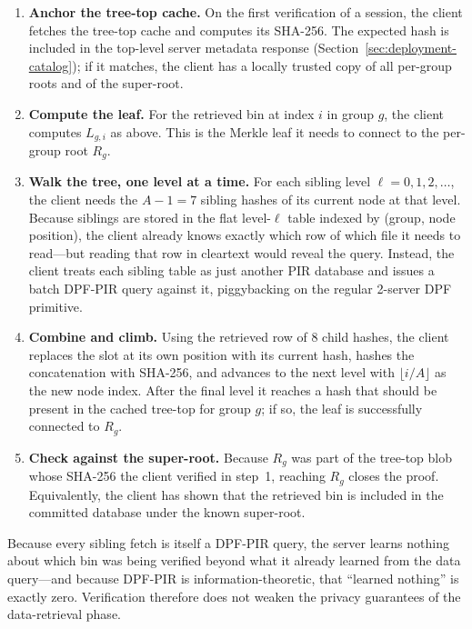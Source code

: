 \begin{enumerate}[nolistsep,leftmargin=*]
    \item \textbf{Anchor the tree-top cache.} On the first verification of a session, the client fetches the tree-top cache and computes its SHA-256. The expected hash is included in the top-level server metadata response (Section~\ref{sec:deployment-catalog}); if it matches, the client has a locally trusted copy of all per-group roots and of the super-root.

    \item \textbf{Compute the leaf.} For the retrieved bin at index $i$ in group $g$, the client computes $L_{g,i}$ as above. This is the Merkle leaf it needs to connect to the per-group root $R_g$.

    \item \textbf{Walk the tree, one level at a time.} For each sibling level $\ell = 0, 1, 2, \ldots$, the client needs the $A - 1 = 7$ sibling hashes of its current node at that level. Because siblings are stored in the flat level-$\ell$ table indexed by (group, node position), the client already knows exactly which row of which file it needs to read---but reading that row in cleartext would reveal the query. Instead, the client treats each sibling table as just another PIR database and issues a batch DPF-PIR query against it, piggybacking on the regular 2-server DPF primitive.

    \item \textbf{Combine and climb.} Using the retrieved row of 8 child hashes, the client replaces the slot at its own position with its current hash, hashes the concatenation with SHA-256, and advances to the next level with $\lfloor i / A \rfloor$ as the new node index. After the final level it reaches a hash that should be present in the cached tree-top for group $g$; if so, the leaf is successfully connected to $R_g$.

    \item \textbf{Check against the super-root.} Because $R_g$ was part of the tree-top blob whose SHA-256 the client verified in step~1, reaching $R_g$ closes the proof. Equivalently, the client has shown that the retrieved bin is included in the committed database under the known super-root.
\end{enumerate}

Because every sibling fetch is itself a DPF-PIR query, the server learns nothing about which bin was being verified beyond what it already learned from the data query---and because DPF-PIR is information-theoretic, that ``learned nothing'' is exactly zero. Verification therefore does not weaken the privacy guarantees of the data-retrieval phase.

